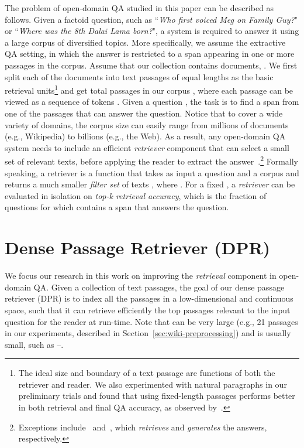 \documentclass[11pt,a4paper]{article}
\def\model/{DPR}
\begin{document}
The problem of open-domain QA studied in this paper can be described as follows.  Given a factoid question, such as
``\emph{Who first voiced Meg on Family Guy?}" or ``\emph{Where was the 8th Dalai Lama born?}", a system is required
to answer it using a large corpus of diversified topics.
More specifically, we assume the extractive QA setting, in which the answer is restricted to a span appearing in one or more passages in the corpus.
Assume that our collection contains  documents, .
We first split each of the documents into text passages of equal lengths as the basic retrieval units\footnote{The ideal size and boundary of a text passage are functions of both the retriever and reader. We also experimented with natural paragraphs in our preliminary trials and found that using fixed-length passages performs better in both retrieval and final QA accuracy, as observed by~\citet{wang2019multi}.}
and get  total passages in our corpus , where
each passage  can be viewed as a sequence of tokens .
Given a question , the task is to find a span 
from one of the passages  that can answer the question.
Notice that to cover a wide variety of domains, the corpus size can easily range from millions of documents (e.g., Wikipedia) to billions (e.g., the Web).
As a result, any open-domain QA system needs to include an efficient \emph{retriever} component that
can select a small set of relevant texts, before applying the reader to extract the answer~\cite{chen2017reading}.\footnote{Exceptions include~\cite{seo2019real} and~\cite{roberts2020much}, which \emph{retrieves} and \emph{generates} the answers, respectively.}
Formally speaking, a retriever  is a function that takes as input a question  and a corpus  and returns
a much smaller \emph{filter set} of texts , where .  For a fixed , a \emph{retriever} can be evaluated in isolation on \emph{top-k retrieval accuracy}, which is the fraction of questions for which  contains a span that answers the question.



 
\section{Dense Passage Retriever (\model/)}
\label{sec:retriever}


We focus our research in this work on improving the \emph{retrieval} component in open-domain QA.
Given a collection of  text passages, the goal of our dense passage retriever (\model/) is to index all the passages in a low-dimensional and continuous space,
such that it can retrieve efficiently the top  passages relevant to the input question for the reader at run-time.
Note that  can be very large
(e.g., 21  passages in our experiments, described in Section~\ref{sec:wiki-preprocessing})
and  is usually small, such as --.
\end{document}
